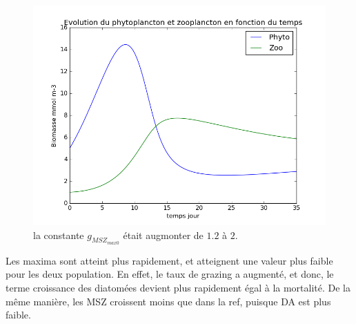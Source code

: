 {{}
\begin{figure}
  \includegraphics[width=\textwidth]{partie1/test1x35.png}
  \caption{\todo la constante $g_{MSZ_{max0}}$ était augmonter de $1.2$ à $2$.}
  \label{fig:partie1t1}
\end{figure}
\par{
Les maxima sont atteint plus rapidement, et atteignent une valeur plus faible pour les deux population.
En effet, le taux de grazing a augmenté, et donc, le terme croissance des diatomées devient plus rapidement
égal à la mortalité. De la même manière, les MSZ croissent moins que dans la ref, puisque DA est plus faible.
}
\FloatBarrier

\clearpage
}
